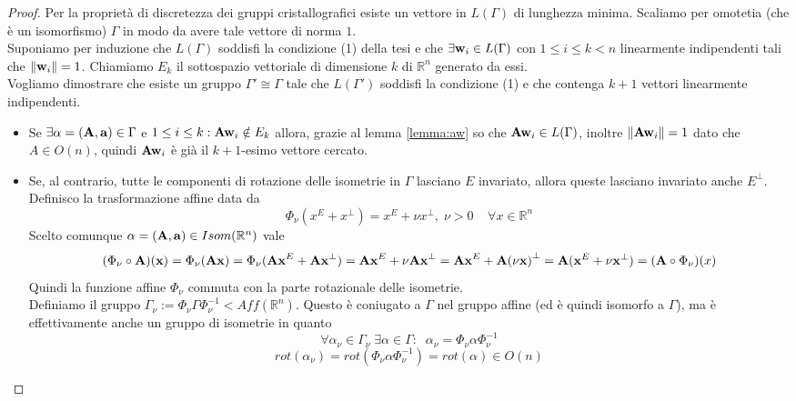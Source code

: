 \documentclass[a4paper]{book}
\begin{document}
\begin{proof}
Per la proprietà di discretezza dei gruppi cristallografici esiste un vettore in $L(\Gamma)$ di lunghezza minima. Scaliamo per omotetia (che è un isomorfismo) $\Gamma$ in modo da avere tale vettore di norma $1$. \\ 

Suponiamo per induzione che $L(\Gamma)$ soddisfi la condizione (1) della tesi e che $\exists \vb{w}_i \in L(\Gamma)$ con $1 \leq i \leq k < n $ linearmente indipendenti tali che $\norm{\vb{w}_i} = 1 $.  
Chiamiamo $E_k$ il sottospazio vettoriale di dimensione $k$ di $\mathbb{R}^n$ generato da essi.\\
Vogliamo dimostrare che esiste un gruppo $\Gamma ' \cong \Gamma$ tale che $L(\Gamma')$ soddisfi la condizione (1) e che contenga $k+1$ vettori linearmente indipendenti. 
\begin{itemize}
\item Se $\exists \alpha = (\vb{A, a}) \in \Gamma $ e $1 \leq i \leq k: \vb{Aw}_i \notin E_k$ allora, grazie al lemma \ref{lemma:aw} so che $\vb{Aw}_i \in L(\Gamma)$, inoltre $\norm{\vb{Aw}_i} = 1$ dato che $A \in O(n)$, quindi $\vb{Aw}_i$ è già il $k+1$-esimo vettore cercato.
\item Se, al contrario, tutte le componenti di rotazione delle isometrie in $\Gamma$ lasciano $E$ invariato, allora queste lasciano invariato anche $E^{\perp}$. \\
Definisco la trasformazione affine data da
\[ \Phi_{\nu} (x^E + x^{\perp} )=  x^E + \nu x^{\perp} , \; \nu > 0  \; \; \; \; \forall x \in \mathbb{R}^n\]
Scelto comunque $\alpha = (\vb{A,a}) \in Isom(\mathbb{R}^n)$ vale
\[ ( \Phi_{\nu}  \circ \vb{A})(\vb{x}) = \Phi_{\nu} (\vb{Ax})  = \Phi_{\nu} (\vb{Ax}^E +\vb{Ax }^{\perp})  = \vb{Ax}^E +\nu \vb{Ax }^{\perp} = \vb{Ax}^E +\vb{A(\nu x) }^{\perp} = \vb{A} ( \vb{x}^E +\nu \vb{x }^{\perp})  = ( \vb{A} \circ \Phi_{\nu} ) (x)\]
Quindi la funzione affine $\Phi_{\nu}$ commuta con la parte rotazionale delle isometrie. \\
Definiamo il gruppo $\Gamma_{\nu} := \Phi_{\nu} \Gamma \Phi_{\nu}^{-1} < Aff(\mathbb{R}^n)$. Questo è coniugato a $\Gamma$ nel gruppo affine (ed è quindi isomorfo a $\Gamma$), ma è effettivamente anche un gruppo di isometrie in quanto 
\[ \forall \alpha_{\nu} \in \Gamma_{\nu} \; \exists \alpha \in \Gamma : \; \; \alpha_{\nu} =  \Phi_{\nu} \alpha \Phi_{\nu}^{-1}  \]
\[ rot( \alpha_{\nu}) = rot(\Phi_{\nu} \alpha \Phi_{\nu}^{-1}) = rot(\alpha) \in O(n)\]


\end{itemize}
\end{proof}
\end{document}
